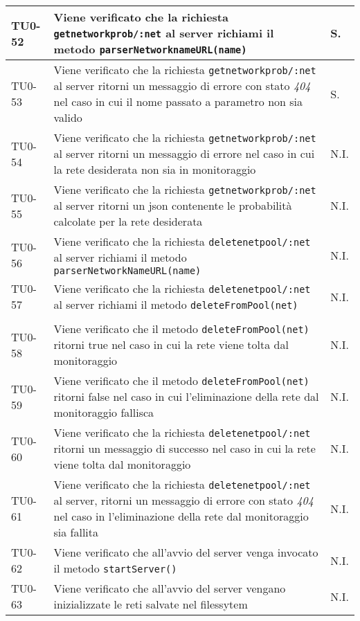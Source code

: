 \begin{longtable}{|C{.15\textwidth}|m{.65\textwidth}|C{.20\textwidth}|}
\hline 
{} TU0-52 & Viene verificato che la richiesta \texttt{getnetworkprob/:net} al server richiami il metodo \texttt{parserNetworknameURL(name)} &  S. \\ 
\hline 
TU0-53 & Viene verificato che la richiesta \texttt{getnetworkprob/:net} al server ritorni un messaggio di errore con stato \textit{404} nel caso in cui il nome passato a parametro non sia valido & S. \\ 
\hline
{} TU0-54 & Viene verificato che la richiesta \texttt{getnetworkprob/:net} al server ritorni un messaggio di errore nel caso in cui la rete desiderata non sia in monitoraggio & N.I. \\ 
\hline 
TU0-55 & Viene verificato che la richiesta \texttt{getnetworkprob/:net} al server ritorni un json contenente le probabilità calcolate per la rete desiderata & N.I. \\ 
\hline 
{} TU0-56 & Viene verificato che la richiesta \texttt{deletenetpool/:net} al server richiami il metodo \texttt{parserNetworkNameURL(name)} & N.I. \\ 
\hline
TU0-57 & Viene verificato che la richiesta \texttt{deletenetpool/:net} al server richiami il metodo \texttt{deleteFromPool(net)} & N.I. \\ \\
\hline 
{} TU0-58 & Viene verificato che il metodo \texttt{deleteFromPool(net)} ritorni true nel caso in cui la rete viene tolta dal monitoraggio & N.I. \\ 
\hline
TU0-59 & Viene verificato che il metodo \texttt{deleteFromPool(net)} ritorni false nel caso in cui l'eliminazione della rete dal monitoraggio fallisca & N.I. \\ 
\hline 
{} TU0-60 & Viene verificato che la richiesta \texttt{deletenetpool/:net} ritorni un messaggio di successo nel caso in cui la rete viene tolta dal monitoraggio & N.I. \\ 
\hline 
TU0-61 & Viene verificato che la richiesta \texttt{deletenetpool/:net} al server, ritorni un messaggio di errore con stato \textit{404} nel caso in l'eliminazione della rete dal monitoraggio sia fallita & N.I. \\ 
\hline 
{} TU0-62 & Viene verificato che all'avvio del server venga invocato il metodo \texttt{startServer()} & N.I. \\ 
\hline
TU0-63 & Viene verificato che all'avvio del server vengano inizializzate le reti salvate nel filessytem & N.I. \\ 

\end{longtable}
